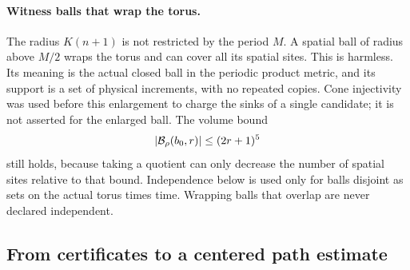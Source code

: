 \paragraph{Witness balls that wrap the torus.}
The radius \(K(n+1)\) is not restricted by the period \(M\).
A spatial ball of radius above \(M/2\) wraps the torus and can cover
all its spatial sites. This is harmless. Its meaning is the actual
closed ball in the periodic product metric, and its support is a
set of physical increments, with no repeated copies. Cone
injectivity was used before this enlargement to charge the sinks
of a single candidate; it is not asserted for the enlarged ball.
The volume bound
\[
 |\mathcal B_\rho(b_0,r)|\le(2r+1)^5
\]
still holds, because taking a quotient can only decrease the number
of spatial sites relative to that bound. Independence below is used
only for balls disjoint as sets on the actual torus times time.
Wrapping balls that overlap are never declared independent.

\subsection{From certificates to a centered path estimate}

